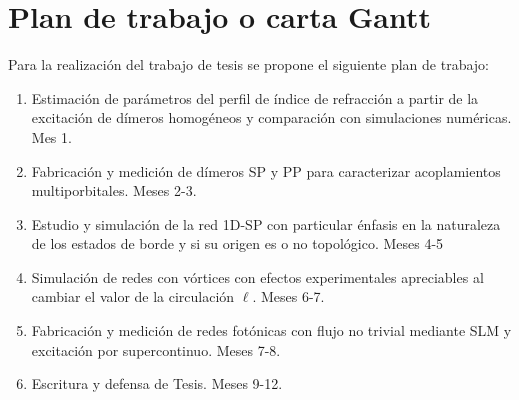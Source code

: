\documentclass{article}
\begin{document}
\section{Plan de trabajo o carta Gantt}

Para la realización del trabajo de tesis se propone el siguiente plan de trabajo:

\begin{enumerate}
	\item Estimación de parámetros del perfil de índice de refracción a partir de la excitación de dímeros homogéneos y comparación con simulaciones numéricas. Mes 1.
	\item Fabricación y medición de dímeros SP y PP para caracterizar acoplamientos multiporbitales. Meses 2-3.
	\item Estudio y simulación de la red 1D-SP con particular énfasis en la naturaleza de los estados de borde y si su origen es o no topológico. Meses 4-5
	\item Simulación de redes con vórtices con efectos experimentales apreciables al cambiar el valor de la circulación $\ell$. Meses 6-7.
	\item Fabricación y medición de redes fotónicas con flujo no trivial mediante SLM y excitación por supercontinuo. Meses 7-8.
	\item Escritura y defensa de Tesis. Meses 9-12.
\end{enumerate}


\renewcommand\refname{Referencias}




\end{document}
